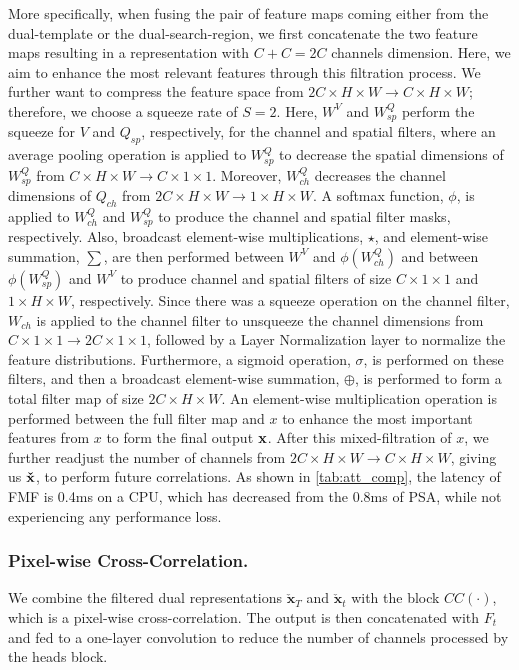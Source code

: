 More specifically, when fusing the pair of feature maps coming either from the dual-template or the dual-search-region, we first concatenate the two feature maps resulting in a representation with $C+C=2C$ channels dimension. Here, we aim to enhance the most relevant features through this filtration process. We further want to compress the feature space from $2C \times H \times W \rightarrow C \times H \times W$; therefore, we choose a squeeze rate of $S = 2$. Here, $W^V$ and $W^Q_{sp}$ perform the squeeze for $V$ and $Q_{sp}$, respectively, for the channel and spatial filters, where an average pooling operation is applied to $W^Q_{sp}$ to decrease the spatial dimensions of $W^Q_{sp}$ from $C \times H \times W \rightarrow C \times 1 \times 1$.  Moreover, $W^Q_{ch}$ decreases the channel dimensions of $Q_{ch}$ from $2C \times H \times W \rightarrow 1 \times H \times W$. A softmax function, $\phi$, is applied to $W^Q_{ch}$ and $W^Q_{sp}$ to produce the channel and spatial filter masks, respectively. Also, broadcast element-wise multiplications, $\star$, and element-wise summation, $\sum$, are then performed between $W^V$ and $\phi(W^Q_{ch})$ and between $\phi (W^Q_{sp})$ and $W^V$ to produce channel and spatial filters of size $C \times 1 \times 1$ and $1 \times H \times W$, respectively. Since there was a squeeze operation on the channel filter, $W_{ch}$ is applied to the channel filter to unsqueeze the channel dimensions from $C \times 1 \times 1 \rightarrow 2C \times 1 \times 1$, followed by a Layer Normalization layer to normalize the feature distributions. Furthermore, a sigmoid operation, $\sigma$, is performed on these filters, and then a broadcast element-wise summation, $\oplus$, is performed to form a total filter map of size $2C \times H \times W$. An element-wise multiplication operation is performed between the full filter map and $x$ to enhance the most important features from $x$ to form the final output $\bold{x}$. After this mixed-filtration of $x$, we further readjust the number of channels from  $2C \times H \times W \rightarrow C \times H \times W$, giving us $\bold{\check{x} }$, to perform future correlations. As shown in \ref{tab:att_comp}, the latency of FMF is 0.4ms on a CPU, which has decreased from the 0.8ms of PSA, while not experiencing any performance loss.\\



\subsubsection{Pixel-wise Cross-Correlation.}
We combine the filtered dual representations $\boldsymbol{\check{x}}_T$ and $\boldsymbol{\check{x}}_t$ with the block $CC(\cdot)$, which is a pixel-wise cross-correlation. The output is then concatenated with $F_t$ and fed to a one-layer convolution to reduce the number of channels processed by the heads block.

